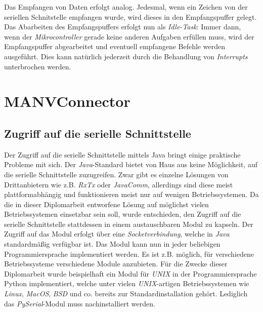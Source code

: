 Das Empfangen von Daten erfolgt analog. Jedesmal, wenn ein Zeichen von der seriellen Schnitstelle empfangen
wurde, wird dieses in den Empfangspuffer gelegt. Das Abarbeiten des Empfangspuffers erfolgt nun als \emph{Idle-Task}:
Immer dann, wenn der \emph{Mikrocontroller} gerade keine anderen Aufgaben erfüllen muss, wird der Empfangspuffer
abgearbeitet und eventuell empfangene Befehle werden ausgeführt. Dies kann natürlich jederzeit durch 
die Behandlung von \emph{Interrupts} unterbrochen werden.

\section{MANVConnector}
\subsection{Zugriff auf die serielle Schnittstelle}
Der Zugriff auf die serielle Schnittstelle mittels Java bringt einige praktische Probleme mit sich.
Der \emph{Java}-Standard bietet von Haus aus keine Möglichkeit, auf die serielle Schnittstelle zuzugreifen.
Zwar gibt es einzelne Lösungen von Dritt\-an\-bie\-tern wie z.B. \emph{RxTx} oder \emph{JavaComm}, allerdings
sind diese meist plattformabhängig und funktionieren meist nur auf wenigen Betriebssystemen. Da die
in dieser Diplomarbeit entworfene Lösung auf möglichst vielen Betriebssystemen einsetzbar sein soll, 
wurde entschieden, den Zugriff auf die serielle Schnittstelle stattdessen in einem austauschbaren
Modul zu kapseln. Der Zugriff auf das Modul erfolgt über eine \emph{Socketverbindung}, welche in \emph{Java}
standardmäßig verfügbar ist. Das Modul kann nun in jeder beliebigen Programmiersprache implementiert
werden. Es ist z.B. möglich, für verschiedene Betriebssysteme verschiedene Module anzubieten.
Für die Zwecke dieser Diplomarbeit wurde beispielhaft ein Modul für \emph{UNIX} in der Programmiersprache
Python implementiert, welche unter vielen \emph{UNIX}-artigen Betriebssystemen wie \emph{Linux}, \emph{MacOS}, 
\emph{BSD} und co.  bereits zur Standardinstallation gehört. Lediglich das \emph{PySerial}-Modul muss nachinstalliert werden.

